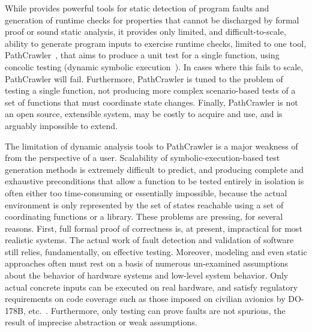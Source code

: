 While \framac{} provides powerful tools for static detection of program faults and generation of runtime checks for properties that cannot be discharged by formal proof or sound static analysis, it provides only limited, and difficult-to-scale, ability to generate program inputs to exercise runtime checks, limited to one tool, PathCrawler~\cite{WilliamsMMR05EDCC}, that aims to produce a unit test for a single function, using concolic testing (dynamic symbolic execution~\cite{GodefroidKS05}).  In cases where this fails to scale, PathCrawler will fail.  Furthermore, PathCrawler is tuned to the problem of testing a single function, not producing more complex scenario-based tests of a set of functions that must coordinate state changes.  Finally, PathCrawler is not an open source, extensible system, may be costly to acquire and use, and is arguably impossible to extend.

The limitation of dynamic analysis tools to PathCrawler is a major weakness of \framac from the perspective of a user.  Scalability of symbolic-execution-based test generation methods is extremely difficult to predict, and producing complete and exhaustive preconditions that allow a function to be tested entirely in isolation is often either too time-consuming or essentially impossible, because the actual environment is only represented by the set of states reachable using a set of coordinating functions or a library.  These problems are pressing, for several reasons.  First, full formal proof of correctness is, at present, impractical for most realistic systems.  The actual work of fault detection and validation of software still relies, fundamentally, on effective testing.  Moreover, modeling and even static approaches often must rest on a basis of numerous un-examined assumptions about the behavior of hardware systems and low-level system behavior.  Only actual concrete inputs can be executed on real hardware, and satisfy regulatory requirements on code coverage such as those imposed on civilian avionics by DO-178B, etc.~\cite{MCDC}.  Furthermore, only testing can prove faults are not spurious, the result of imprecise abstraction or weak assumptions.

